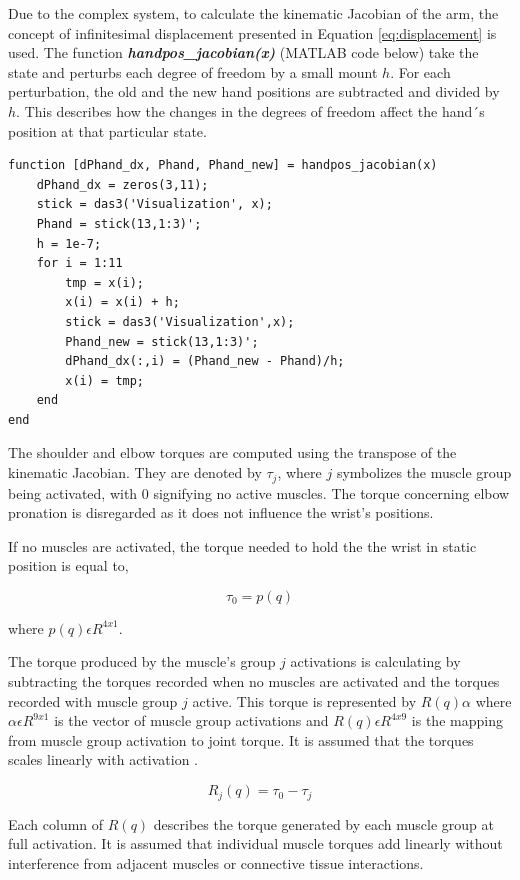 Due to the complex system, to calculate the kinematic Jacobian of the arm, the concept of infinitesimal displacement presented in Equation \ref{eq:displacement} is used. The function \textbf{\textit{handpos\_jacobian(x)}} (MATLAB code below) take the state and perturbs each degree of freedom by a small mount $h$. For each perturbation, the old and the new hand positions are  subtracted and divided by $h$. This describes how the changes in the degrees of freedom affect the hand´s position at that particular state. 

\begin{lstlisting}[style=Matlab-editor]
function [dPhand_dx, Phand, Phand_new] = handpos_jacobian(x)
    dPhand_dx = zeros(3,11);
    stick = das3('Visualization', x);
    Phand = stick(13,1:3)';
    h = 1e-7;
    for i = 1:11
        tmp = x(i);
        x(i) = x(i) + h;
        stick = das3('Visualization',x);
        Phand_new = stick(13,1:3)';
        dPhand_dx(:,i) = (Phand_new - Phand)/h;
        x(i) = tmp;
    end        
end
\end{lstlisting}

The shoulder and elbow torques are computed using the transpose of the kinematic Jacobian. They are denoted by $\tau_{j}$, where $j$ symbolizes the muscle group being activated, with 0 signifying no active muscles. The torque concerning elbow pronation is disregarded as it does not influence the wrist's positions. 

If no muscles are activated, the torque needed to hold the the wrist in static position is equal to,

\begin{equation}
\tau_0 = p(q)
\end{equation}

where $p(q) \epsilon  R^{4x1}$. 

The torque produced by the muscle's group $j$ activations is calculating by subtracting the torques recorded when no muscles are activated and the torques recorded with muscle group $j$ active. This torque  is represented by $R(q)\alpha$ where $\alpha \epsilon R^{9x1}$ is the vector of muscle group activations and $R(q) \epsilon R^{4x9}$ is the mapping from muscle group activation to joint torque. It is assumed that the torques scales linearly with activation \cite{SPI}. 

\begin{equation}
    R_j(q) = \tau_0 - \tau_j
\end{equation}

Each column of $R(q)$ describes the torque generated by each muscle group at full activation. It is assumed that individual muscle torques add linearly without interference from adjacent muscles or connective tissue interactions. 




